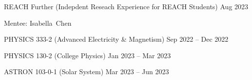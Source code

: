 


\begin{cventries}

{REACH Further (Indepdent Reseach Experience for REACH Students)}
{Aug 2023}
{\begin{cvitems}
	\item {Mentee: Isabella~Chen}
\end{cvitems}}

{PHYSICS 333-2 (Advanced Electricity \& Magnetism)}
{Sep 2022 -- Dec 2022}
{}

{PHYSICS 130-2 (College Physics)}
{Jan 2023 -- Mar 2023}
{}

{ASTRON 103-0-1 (Solar System)}
{Mar 2023 -- Jun 2023}
{}

\end{cventries}